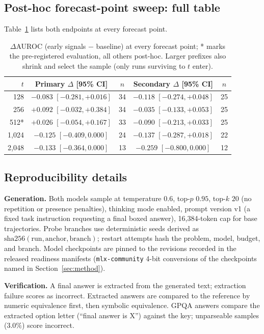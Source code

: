 \subsection{Post-hoc forecast-point sweep: full table}

Table~\ref{tab:sweep} lists both endpoints at every forecast point.

\begin{table}[h]\centering\small
\begin{tabular}{rcccc}
\toprule
$t$ & Primary $\Delta$ [95\% CI] & $n$ & Secondary $\Delta$ [95\% CI] & $n$ \\
\midrule
128    & $-0.083$ $[-0.281, +0.016]$ & 34 & $-0.118$ $[-0.274, +0.048]$ & 25 \\
256    & $+0.092$ $[-0.032, +0.384]$ & 34 & $-0.035$ $[-0.133, +0.053]$ & 25 \\
512*   & $+0.026$ $[-0.054, +0.167]$ & 33 & $-0.090$ $[-0.213, +0.033]$ & 25 \\
1{,}024 & $-0.125$ $[-0.409, 0.000]$ & 24 & $-0.137$ $[-0.287, +0.018]$ & 22 \\
2{,}048 & $-0.133$ $[-0.364, 0.000]$ & 13 & $-0.259$ $[-0.800, 0.000]$ & 12 \\
\bottomrule
\end{tabular}
\caption{$\Delta$AUROC (early signals $-$ baseline) at every forecast
point; * marks the pre-registered evaluation, all others post-hoc. Larger
prefixes also shrink and select the sample (only runs surviving to $t$
enter).}
\label{tab:sweep}\end{table}

\subsection{Reproducibility details}\label{app:repro}

\textbf{Generation.} Both models sample at temperature $0.6$, top-$p$
$0.95$, top-$k$ $20$ (no repetition or presence penalties), thinking mode
enabled, prompt version v1 (a fixed task instruction requesting a final
boxed answer), 16{,}384-token cap for base trajectories. Probe branches
use deterministic seeds derived as
$\mathrm{sha256}(\text{run},\text{anchor},\text{branch})$; restart
attempts hash the problem, model, budget, and branch. Model checkpoints
are pinned to the revisions recorded in the released readiness manifests
(\texttt{mlx-community} 4-bit conversions of the checkpoints named in
Section~\ref{sec:method}).

\textbf{Verification.} A final answer is extracted from the generated
text; extraction failure scores as incorrect. Extracted answers are
compared to the reference by numeric equivalence first, then symbolic
equivalence. GPQA answers compare the extracted option letter
(``final answer is X'') against the key; unparseable samples ($3.0\%$)
score incorrect.

